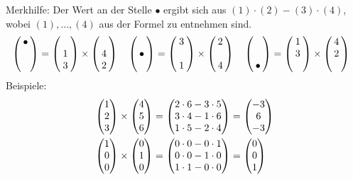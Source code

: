 		\noindent Merkhilfe: Der Wert an der Stelle $\bullet$ ergibt sich aus
		$(1)\cdot(2)-(3)\cdot(4)$, wobei $(1),\dots, (4)$ aus der Formel zu entnehmen
		sind.
		\[\hspace{-7pt}\mvect{\bullet\\\phantom{c_2} \\ \phantom{c_3}} =
		\mvect{\phantom{a_1}\\1\\3}\times
		\mvect{\phantom{b_1}\\4\\2} \quad \mvect{\phantom{c_2} \\ \bullet\\
		\phantom{c_3}} =
		\mvect{3\\\phantom{a_1}\\1}\times
		\mvect{2\\\phantom{b_1}\\4}
		 \quad \mvect{\phantom{c_2} \\ \phantom{c_3}\\ \bullet} =
		\mvect{1\\3\\\phantom{a_1}}\times
		\mvect{4\\2\\\phantom{b_1}}\]
		\newline
		Beispiele:
		\begin{align*}
			\mvect{1\\2\\3}\times \mvect{4\\5\\6} &= \mvect{2\cdot 6-3\cdot 5\\ 3\cdot 4
			- 1\cdot 6\\ 1\cdot 5 - 2\cdot 4} = \mvect{-3\\ 6 \\ -3} \\
			\mvect{1\\0\\0} \times \mvect{0\\ 1 \\ 0} &= \mvect{0\cdot0 - 0\cdot1\\
			0\cdot0 - 1\cdot 0\\ 1\cdot1 - 0\cdot0} = \mvect{0\\0\\1}
		\end{align*}
	
		
